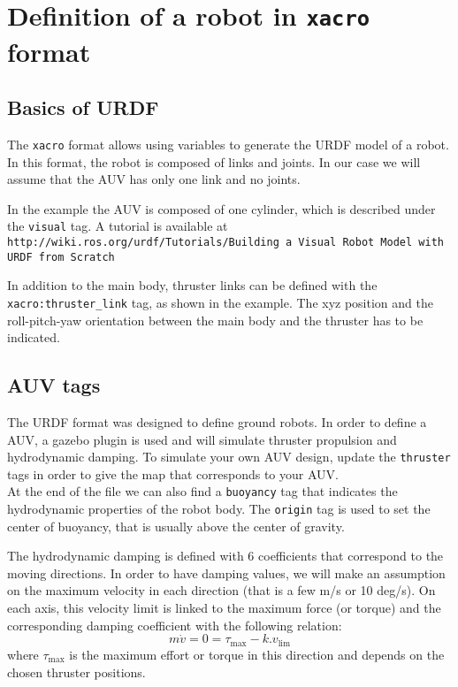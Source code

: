 \documentclass{ecnreport}
\begin{document}
\section{Definition of a robot in \texttt{xacro} format}

\subsection{Basics of URDF}

The \texttt{xacro} format allows using variables to generate the URDF model of a robot. 
In this format, the robot is composed of links and joints. In our case we will assume that the AUV has only one link and no joints.

In the example the AUV is composed of one cylinder, which is described under the \texttt{visual} tag.
A tutorial is available at \texttt{http://wiki.ros.org/urdf/Tutorials/Building a Visual Robot Model with URDF from Scratch}

In addition to the main body, thruster links can be defined with the \texttt{xacro:thruster\_link} tag, as  shown in the example.
The xyz position and the roll-pitch-yaw orientation between the main body and the thruster has to be indicated.

\subsection{AUV tags}

The URDF format was designed to define ground robots. In order to define a AUV, a gazebo plugin is used and will simulate thruster propulsion and hydrodynamic damping.
To simulate your own AUV design, update the \texttt{thruster} tags  in order to give the map that corresponds to your AUV. \\
At the end of the file we can also find a \texttt{buoyancy} tag that indicates the hydrodynamic properties of the robot body. The \texttt{origin} tag is used to set the center of buoyancy, that is usually above the center of gravity.

The hydrodynamic damping is defined with 6 coefficients that correspond to the moving directions.
In order to have damping values, we will make an assumption on the maximum velocity in each direction (that is a few m/s or 10 deg/s).
On each axis, this velocity limit is linked to the maximum force (or torque) and the corresponding damping coefficient with the following relation:
\begin{equation*}
 m\dot v = 0 = \tau_{\max} - k.v_{\lim{}}
\end{equation*}where $\tau_{\max}$ is the maximum effort or torque in this direction and depends on the chosen thruster positions.
\end{document}
